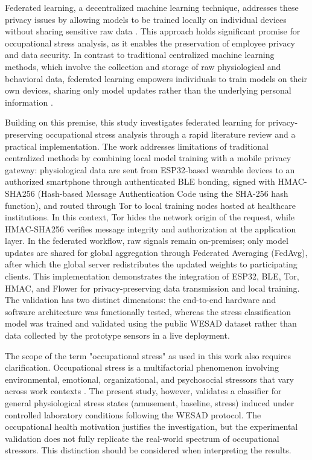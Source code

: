 \documentclass[12pt]{article}
\begin{document}
Federated learning, a decentralized machine learning technique, addresses these privacy issues by allowing models to be trained locally on individual devices without sharing sensitive raw data \cite{yekta_said_can_3e1184b6, ziyu_wang_a7666f66}. This approach holds significant promise for occupational stress analysis, as it enables the preservation of employee privacy and data security. In contrast to traditional centralized machine learning methods, which involve the collection and storage of raw physiological and behavioral data, federated learning empowers individuals to train models on their own devices, sharing only model updates rather than the underlying personal information \cite{muhammad_ali_fauzi_c546a580}.

Building on this premise, this study investigates federated learning for privacy-preserving occupational stress analysis through a rapid literature review and a practical implementation. The work addresses limitations of traditional centralized methods by combining local model training with a mobile privacy gateway: physiological data are sent from ESP32-based wearable devices to an authorized smartphone through authenticated BLE bonding, signed with HMAC-SHA256 (Hash-based Message Authentication Code using the SHA-256 hash function), and routed through Tor to local training nodes hosted at healthcare institutions. In this context, Tor hides the network origin of the request, while HMAC-SHA256 verifies message integrity and authorization at the application layer. In the federated workflow, raw signals remain on-premises; only model updates are shared for global aggregation through Federated Averaging (FedAvg), after which the global server redistributes the updated weights to participating clients. This implementation demonstrates the integration of ESP32, BLE, Tor, HMAC, and Flower for privacy-preserving data transmission and local training. The validation has two distinct dimensions: the end-to-end hardware and software architecture was functionally tested, whereas the stress classification model was trained and validated using the public WESAD dataset rather than data collected by the prototype sensors in a live deployment.

The scope of the term "occupational stress" as used in this work also requires clarification. Occupational stress is a multifactorial phenomenon involving environmental, emotional, organizational, and psychosocial stressors that vary across work contexts \cite{morales2026affective}. The present study, however, validates a classifier for general physiological stress states (amusement, baseline, stress) induced under controlled laboratory conditions following the WESAD protocol. The occupational health motivation justifies the investigation, but the experimental validation does not fully replicate the real-world spectrum of occupational stressors. This distinction should be considered when interpreting the results.
\end{document}
